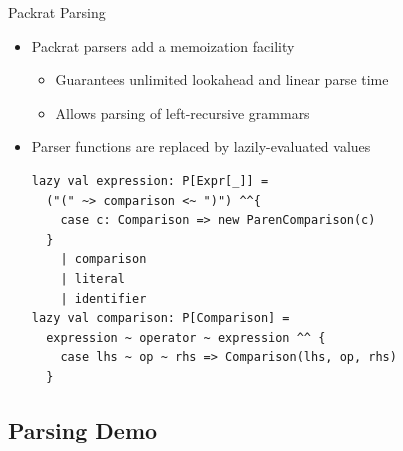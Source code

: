 \documentclass{beamer}
\begin{document}
\begin{frame}[fragile]{Packrat Parsing}
  \begin{itemize}
    \item \alert{Packrat parsers} add a memoization facility~\cite{jonnalagedda2009packrat,frost2008parser}  \pause
    \begin{itemize}
      \item Guarantees unlimited lookahead and linear parse time  \pause
      \item Allows parsing of left-recursive grammars  \pause
    \end{itemize}
    \item Parser functions are replaced by lazily-evaluated values  \pause
        \begin{example}
    \begin{verbatim}
lazy val expression: P[Expr[_]] = 
  ("(" ~> comparison <~ ")") ^^{
    case c: Comparison => new ParenComparison(c)
  }
    | comparison
    | literal
    | identifier
lazy val comparison: P[Comparison] = 
  expression ~ operator ~ expression ^^ {
    case lhs ~ op ~ rhs => Comparison(lhs, op, rhs)
  }  
    \end{verbatim}
    \end{example}
  \end{itemize}
\end{frame}
\subsection{Parsing Demo}
\end{document}
